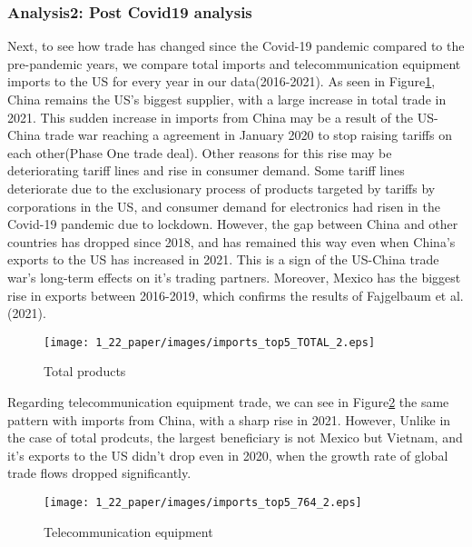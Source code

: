 \documentclass[a4paper, 12pt]{article}
\begin{document}
\subsubsection{Analysis2: Post Covid19 analysis}
Next, to see how trade has changed since the Covid-19 pandemic compared to the pre-pandemic years, we compare total imports and telecommunication equipment imports to the US for every year in our data(2016-2021).
As seen in Figure\ref{fig:top5_total_2}, China remains the US's biggest supplier, with a large increase in total trade in 2021.
This sudden increase in imports from China may be a result of the US-China trade war reaching a agreement in January 2020 to stop raising tariffs on each other(Phase One trade deal).
Other reasons for this rise may be deteriorating tariff lines and rise in consumer demand.
Some tariff lines deteriorate due to the exclusionary process of products targeted by tariffs by corporations in the US, and consumer demand for electronics had risen in the Covid-19 pandemic due to lockdown\cite{bown2022four}.
However, the gap between China and other countries has dropped since 2018, and has remained this way even when China's exports to the US has increased in 2021.
This is a sign of the US-China trade war's long-term effects on it's trading partners.
Moreover, Mexico has the biggest rise in exports between 2016-2019, which confirms the results of Fajgelbaum et al.(2021)\cite{fajgelbaum2021}.
\begin{figure}[H]
    \centering
    \texttt{[image: 1\_22\_paper/images/imports\_top5\_TOTAL\_2.eps]}
    \caption{Total products}
    \label{fig:top5_total_2}
\end{figure}
Regarding telecommunication equipment trade, we can see in Figure\ref{fig:top5_764_2} the same pattern with imports from China, with a sharp rise in 2021.
However, Unlike in the case of total prodcuts, the largest beneficiary is not Mexico but Vietnam, and it's exports to the US didn't drop even in 2020, when the growth rate of global trade flows dropped significantly\cite{unctad2021key}.
\begin{figure}[H]
    \centering
    \texttt{[image: 1\_22\_paper/images/imports\_top5\_764\_2.eps]}
    \caption{Telecommunication equipment}
    \label{fig:top5_764_2}
\end{figure}

\newpage
\end{document}

